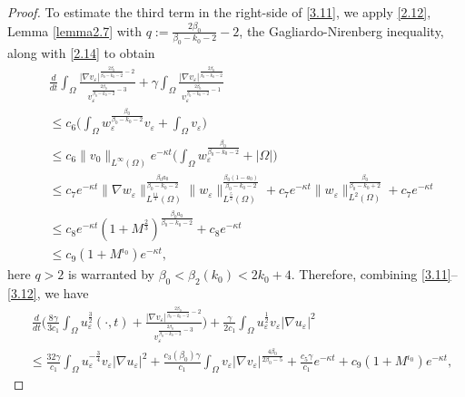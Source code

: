 \documentclass[10pt,a4paper]{amsart}
\begin{document}
\begin{proof}
To estimate the third term in the right-side of \eqref{3.11}, we  apply \eqref{2.12}, Lemma \ref{lemma2.7} with $q:=\frac{2\beta_0}{\beta_0-k_0-2}-2$, the Gagliardo-Nirenberg inequality, along with \eqref{2.14} to obtain
    \begin{align}\label{3.12}
       & \frac{d}{dt}\int_{\Omega}
       \frac{
       |\nabla v_\varepsilon|^{
       \frac{2\beta_0}{\beta_0-k_0-2}-2}
       }
       {v_\varepsilon^{
       \frac{2\beta_0}{\beta_0-k_0-2}
       -3}}+
       \gamma \int_{\Omega}\frac{|\nabla v_\varepsilon|^{
       \frac{2\beta_0}{\beta_0-k_0-2}
       }}{v_\varepsilon^{
       \frac{2\beta_0}{\beta_0-k_0-2}
      -1}}\nonumber\\
        &\leq  c_6\bigg(\int_{\Omega}w_\varepsilon^{\frac{\beta_0}{\beta_0-k_0-2}}v_\varepsilon+\int_\Omega v_\varepsilon\bigg)\nonumber\\
        &\leq c_6 \|v_0\|_{L^{\infty}(\Omega)}e^{-\kappa t}\big(\int_\Omega w_\varepsilon^{\frac{\beta_0}{\beta_0-k_0-2}}+|\Omega|\big)\\
        &\leq c_7e^{-\kappa t}\|\nabla w_\varepsilon\|_{L^{\frac{11}{4}}(\Omega)}^{\frac{\beta_0 a_0}{\beta_0-k_0-2}}
        \|w_\varepsilon\|_{L^{\frac{5}{2}}(\Omega)}
        ^{\frac{\beta_0(1-a_0)}{\beta_0-k_0-2}}
        +c_7e^{-\kappa t}\|w_\varepsilon\|_{L^2(\Omega)}^{\frac{\beta_0}{\beta_0-k_0+2}}+c_7e^{-\kappa t}\nonumber\\
            &\leq c_8e^{-\kappa t}(1+M^{\frac{2}{3}})^{\frac{\beta_0 a_0}{\beta_0-k_0-2}}+c_8e^{-\kappa t}\nonumber\\
            &\leq c_9 (1+M^{\iota_0})e^{-\kappa t},\nonumber
    \end{align}
    here $q>2$ is warranted by $\beta_0<\beta_2(k_0)<2k_0+4$.
Therefore, combining \eqref{3.11}--\eqref{3.12}, we have
\begin{align}
&~\frac{d}{dt}\bigg(\frac{8\gamma}{3c_1}\int_\Omega u_\varepsilon^{\frac{3}{2}}(\cdot,t)+\frac{
       |\nabla v_\varepsilon|^{
       \frac{2\beta_0}{\beta_0-k_0-2}-2}}{v_\varepsilon^{
       \frac{2\beta_0}{\beta_0-k_0-2}
       -3}}\bigg)+\frac{\gamma}{2c_1}\int_\Omega u_\varepsilon^{\frac{1}{2}}v_\varepsilon|\nabla u_\varepsilon|^2\\
       &\leq \frac{32\gamma}{c_1} \int_\Omega u_\varepsilon^{-\frac{3}{4}}v_\varepsilon|\nabla u_\varepsilon|^2+\frac{c_3(\beta_0)\gamma}{c_1}\int_\Omega v_\varepsilon|\nabla v_\varepsilon|^{\frac{4\beta_0}{2\beta_0-5}}+\frac{c_5\gamma}{c_1}e^{-\kappa t}+c_9 (1+M^{\iota_0})e^{-\kappa t},\nonumber
\end{align}

\end{proof}
\end{document}
